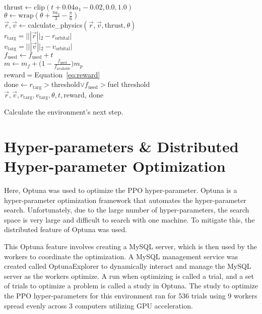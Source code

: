\begin{algorithm}\label{algo:step}
	\SetAlgoLined
	\DontPrintSemicolon
	$\text{thrust}\leftarrow \text{clip}(t + 0.04 a_1 - 0.02, 0.0, 1.0)$\\
	$\theta\leftarrow \text{wrap}(\theta + \frac{\pi a_2}{3}-\frac{\pi}{6})$\\
	$\vec{r}, \vec{v}\leftarrow$calculate\_physics$(\vec{r}, \vec{v}, \text{thrust}, \theta)$\\
	$r_{\text{targ}}=|||\vec{r}||_2-r_{\text{orbital}}|$ \\
	$v_{\text{targ}}=|||\vec{v}||_2-v_{\text{orbital}}|$ \\
	$f_{\text{used}}\leftarrow f_{\text{used}}+t$\\
	$m\leftarrow m_f+\big(1-\frac{f_{\text{used}}}{f_{\text{available}}}\big)m_p$\\
	reward$=$Equation~\ref{eq:reward}\\
	done$\leftarrow r_{\text{targ}}>$threshold$\lor f_{\text{used}}>$fuel threshold\\
	\Return $\vec{r}, \vec{v}, r_{\text{targ}}, v_{\text{targ}}, \theta, t,$reward, done
	\caption{Calculate the environment's next step.}
\end{algorithm}
	
\section{Hyper-parameters \& Distributed Hyper-parameter Optimization}

Here, Optuna \cite{DBLP:journals/corr/abs-1907-10902} was used to optimize the PPO hyper-parameter. Optuna is a hyper-parameter optimization framework that automates the hyper-parameter search. Unfortunately, due to the large number of hyper-parameters, the search space is very large and difficult to search with one machine. To mitigate this, the distributed feature of Optuna was used.

This Optuna feature involves creating a MySQL server, which is then used by the workers to coordinate the optimization. A MySQL management service was created called OptunaExplorer to dynamically interact and manage the MySQL server as the workers optimize. A run when optimizing is called a trial, and a set of trials to optimize a problem is called a study in Optuna. The study to optimize the PPO hyper-parameters for this environment ran for 536 trials using 9 workers spread evenly across 3 computers utilizing GPU acceleration.

